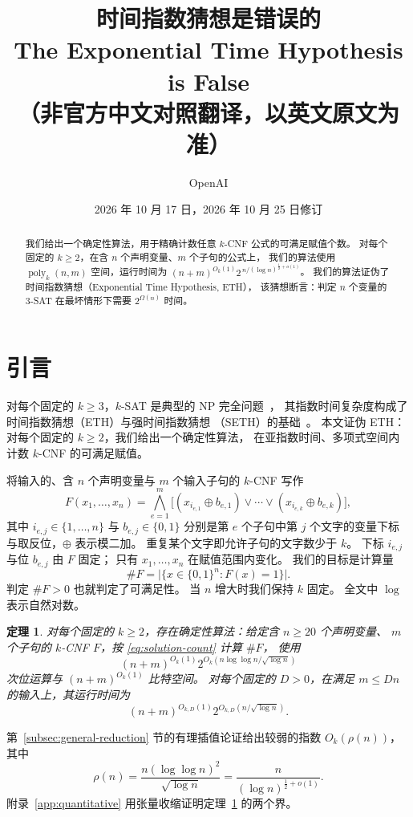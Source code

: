 \documentclass[11pt,reqno]{amsart}
\title{时间指数猜想是错误的\\[0.6em]
 {\large\textmd{The Exponential Time Hypothesis is False}}\\[0.2em]
 {\small\textmd{（非官方中文对照翻译，以英文原文为准）}}}
\author{OpenAI}
\date{2026 年 10 月 17 日，2026 年 10 月 25 日修订}
\numberwithin{equation}{section}
\newtheorem{theorem}{定理}[section]
\theoremstyle{definition}\newtheorem{definition}[theorem]{定义}
\theoremstyle{remark}\newtheorem{remark}[theorem]{注}
\newcommand{\poly}{\operatorname{poly}}
\renewcommand{\le}{\leqslant}
\renewcommand{\ge}{\geqslant}
\begin{document}
\begin{abstract}
我们给出一个确定性算法，用于精确计数任意 $k$-CNF 公式的可满足赋值个数。
对每个固定的 $k\ge2$，在含 $n$ 个声明变量、$m$ 个子句的公式上，
我们的算法使用 $\poly_k(n,m)$ 空间，运行时间为
$(n+m)^{O_k(1)}2^{\,n/(\log n)^{\frac12+o(1)}}$。
我们的算法证伪了时间指数猜想（Exponential Time Hypothesis, ETH），
该猜想断言：判定 $n$ 个变量的 $3$-SAT 在最坏情形下需要
$2^{\Omega(n)}$ 时间。
\end{abstract}
\maketitle

\tableofcontents
\vspace{-\baselineskip}
\section{引言}
对每个固定的 $k\ge3$，$k$-SAT 是典型的 NP 完全问题~\cite{Cook71}，
其指数时间复杂度构成了时间指数猜想（ETH）与强时间指数猜想
（SETH）的基础~\cite{IP01,IPZ}。
本文证伪 ETH：对每个固定的 $k\ge2$，我们给出一个确定性算法，
在亚指数时间、多项式空间内计数 $k$-CNF 的可满足赋值。

将输入的、含 $n$ 个声明变量与 $m$ 个输入子句的 $k$-CNF 写作
\[
 F(x_1,\ldots,x_n)=\bigwedge_{e=1}^m
 \bigl[(x_{i_{e,1}}\oplus b_{e,1})\vee\cdots\vee
       (x_{i_{e,k}}\oplus b_{e,k})\bigr],
\]
其中 $i_{e,j}\in\{1,\ldots,n\}$ 与 $b_{e,j}\in\{0,1\}$ 分别是第
$e$ 个子句中第 $j$ 个文字的变量下标与取反位，$\oplus$ 表示模二加。
重复某个文字即允许子句的文字数少于 $k$。
下标 $i_{e,j}$ 与位 $b_{e,j}$ 由 $F$ 固定；
只有 $x_1,\ldots,x_n$ 在赋值范围内变化。
我们的目标是计算量
\begin{equation}\label{eq:solution-count}
 \#F=\bigl|\{x\in\{0,1\}^n:F(x)=1\}\bigr|.
\end{equation}
判定 $\#F>0$ 也就判定了可满足性。
当 $n$ 增大时我们保持 $k$ 固定。
全文中 $\log$ 表示自然对数。
\begin{theorem}\label{thm:main}
对每个固定的 $k\ge2$，存在确定性算法：给定含 $n\ge20$ 个声明变量、
$m$ 个子句的 $k$-CNF $F$，按 \eqref{eq:solution-count} 计算 $\#F$，
使用
\[
 (n+m)^{O_k(1)}2^{O_k(n\log\log n/\sqrt{\log n})}
\]
次位运算与 $(n+m)^{O_k(1)}$ 比特空间。
对每个固定的 $D>0$，在满足 $m\le Dn$ 的输入上，其运行时间为
\[
 (n+m)^{O_{k,D}(1)}2^{O_{k,D}(n/\sqrt{\log n})}.
\]
\end{theorem}

第~\ref{subsec:general-reduction} 节的有理插值论证给出较弱的指数
$O_k(\rho(n))$，其中
\[
 \rho(n)=\frac{n(\log\log n)^2}{\sqrt{\log n}}
          =\frac{n}{(\log n)^{\frac12+o(1)}}.
\]
附录~\ref{app:quantitative} 用张量收缩证明定理~\ref{thm:main}
的两个界。
\end{document}
